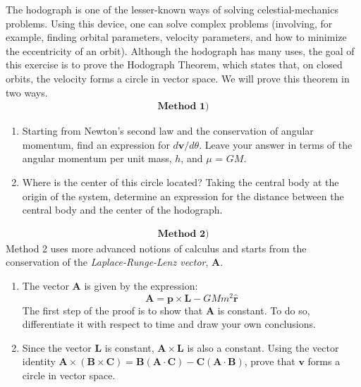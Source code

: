 \documentclass[11pt]{article}
\begin{document}
\begin{pproblem}
    The hodograph is one of the lesser-known ways of solving celestial-mechanics problems. Using this device, one can solve complex problems (involving, for example, finding orbital parameters, velocity parameters, and how to minimize the eccentricity of an orbit). Although the hodograph has many uses, the goal of this exercise is to prove the Hodograph Theorem, which states that, on closed orbits, the velocity forms a circle in vector space. We will prove this theorem in two ways.
    \begin{align*}
    \textbf{Method 1)}
    \end{align*}
    \begin{enumerate}[label=\textbf{\Roman*.}]
        \item Starting from Newton's second law and the conservation of angular momentum, find an expression for \(d\mathbf{v}/d\theta\). Leave your answer in terms of the angular momentum per unit mass, \(h\), and \(\mu\) = \(GM\). 
        \item Where is the center of this circle located? Taking the central body at the origin of the system, determine an expression for the distance between the central body and the center of the hodograph. 
    \end{enumerate}
    
    \begin{align*}
        \textbf{Method 2)}
    \end{align*}
    Method 2 uses more advanced notions of calculus and starts from the conservation of the \textit{Laplace-Runge-Lenz vector}, \(\mathbf{A}\).
    \begin{enumerate}[label=\textbf{\Roman*.}]
        \item The vector \(\mathbf{A}\) is given by the expression:
        \[
        \mathbf{A} = \mathbf{p}\times \mathbf{L} - GMm^2\mathbf{\hat{r}}
        \]
        The first step of the proof is to show that \(\mathbf{A}\) is constant. To do so, differentiate it with respect to time and draw your own conclusions.
        \item Since the vector \(\mathbf{L}\) is constant, \(\mathbf{A}\times\mathbf{L}\) is also a constant. Using the vector identity \(\mathbf{A}\times(\mathbf{B}\times\mathbf{C}) = \mathbf{B}(\mathbf{A}\cdot\mathbf{C}) - \mathbf{C}(\mathbf{A}\cdot\mathbf{B}) \), prove that \(\mathbf{v}\) forms a circle in vector space.    
    \end{enumerate}
    
\end{pproblem}
\end{document}
